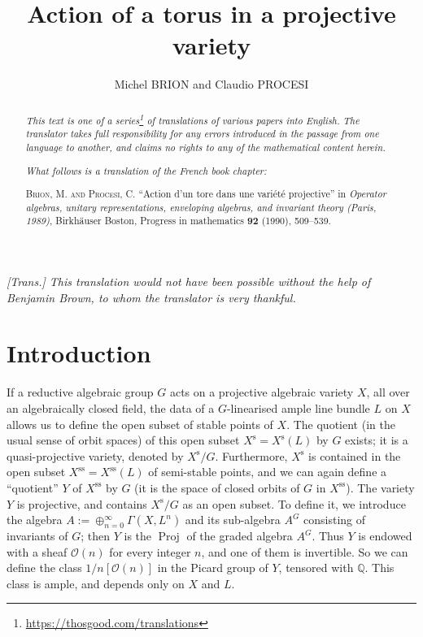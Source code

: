 \documentclass{article}
\title{Action of a torus in a projective variety}
\author{Michel BRION and Claudio PROCESI}
\date{}
\newcommand{\doctype}{French book chapter}
\newcommand{\origcit}{%
  \textsc{Brion, M. and Procesi, C.}
  ``Action d'un tore dans une vari\'{e}t\'{e} projective''
  in \emph{Operator algebras, unitary representations, enveloping algebras, and invariant theory (Paris, 1989)}, Birkh\"{a}user Boston, Progress in mathematics \textbf{92} (1990), 509--539.%
}
\theoremstyle{plain}
\theoremstyle{definition}
\newcommand{\scr}[1]{{\mathscr{#1}}}
\newcommand{\s}{\mathrm{s}}
\renewcommand{\ss}{\mathrm{ss}}
\DeclareMathOperator{\Proj}{Proj}
\begin{document}
\maketitle
\thispagestyle{fancy}

\renewcommand{\abstractname}{Translator's note.}

\begin{abstract}
  \renewcommand*{\thefootnote}{\fnsymbol{footnote}}
  \emph{This text is one of a series\footnote{\url{https://thosgood.com/translations}} of translations of various papers into English.}
  \emph{The translator takes full responsibility for any errors introduced in the passage from one language to another, and claims no rights to any of the mathematical content herein.}

  \medskip
  
  \emph{What follows is a translation of the \doctype:}

  \medskip\noindent
  \origcit
\end{abstract}

\setcounter{footnote}{0}

\tableofcontents
\bigskip



\emph{[Trans.] This translation would not have been possible without the help of Benjamin Brown, to whom the translator is very thankful.}

\section*{Introduction}
\label{introduction}

If a reductive algebraic group $G$ acts on a projective algebraic variety $X$, all over an algebraically closed field, the data of a $G$-linearised ample line bundle $L$ on $X$ allows us to define the open subset of stable points of $X$.
The quotient (in the usual sense of orbit spaces) of this open subset $X^\s=X^\s(L)$ by $G$ exists;
it is a quasi-projective variety, denoted by $X^\s/G$.
Furthermore, $X^\s$ is contained in the open subset $X^\ss=X^\ss(L)$ of semi-stable points, and we can again define a ``quotient'' $Y$ of $X^\ss$ by $G$ (it is the space of closed orbits of $G$ in $X^\ss$).
The variety $Y$ is projective, and contains $X^\s/G$ as an open subset.
To define it, we introduce the algebra $A:=\oplus_{n=0}^\infty \Gamma(X,L^n)$ and its sub-algebra $A^G$ consisting of invariants of $G$;
then $Y$ is the $\Proj$ of the graded algebra $A^G$.
Thus $Y$ is endowed with a sheaf $\scr{O}(n)$ for every integer $n$, and one of them is invertible.
So we can define the class $1/n[\scr{O}(n)]$ in the Picard group of $Y$, tensored with $\mathbb{Q}$.
This class is ample, and depends only on $X$ and $L$.
\end{document}
